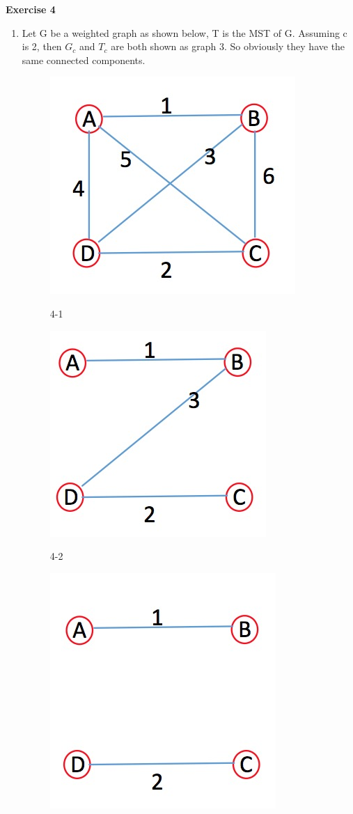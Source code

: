 \documentclass[12pt, notitlepage]{article}
\begin{document}
\textbf{Exercise 4}
\begin{enumerate}
	\item
    Let G be a weighted graph as shown below, T is the MST of G. Assuming c is 2, then $G_c$ and $T_c$ are both shown as graph 3. So obviously they have the same connected components.
    \begin{figure}[H]
	\center
	\includegraphics[width=0.4\linewidth]{4-1.png}\vspace{-10pt}
	\caption{4-1} \nonumber\label{fig:4-1}\vspace{-10pt}
    \end{figure}
    \begin{figure}[H]
	\center
	\includegraphics[width=0.4\linewidth]{4-2.png}\vspace{-10pt}
	\caption{4-2} \nonumber\label{fig:4-2}\vspace{-10pt}
    \end{figure}
    \begin{figure}[H]
	\center
	\includegraphics[width=0.4\linewidth]{4-3.png}\vspace{-10pt}

\end{figure}
\end{enumerate}
\end{document}
